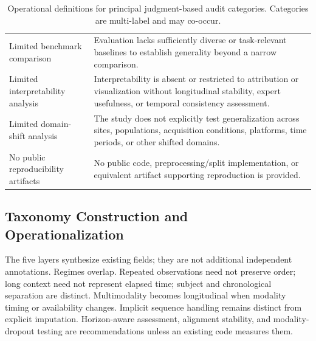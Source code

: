 \documentclass[11pt]{article}
\theoremstyle{plain}
\theoremstyle{definition}
\theoremstyle{remark}
\begin{document}
\begin{table}[!t]
\begin{tabularx}{\textwidth}{p{3.2cm}X}
Limited benchmark comparison & Evaluation lacks sufficiently diverse or task-relevant baselines to establish generality beyond a narrow comparison. \\
Limited interpretability analysis & Interpretability is absent or restricted to attribution or visualization without longitudinal stability, expert usefulness, or temporal consistency assessment. \\
Limited domain-shift analysis & The study does not explicitly test generalization across sites, populations, acquisition conditions, platforms, time periods, or other shifted domains. \\
No public reproducibility artifacts & No public code, preprocessing/split implementation, or equivalent artifact supporting reproduction is provided. \\
\bottomrule
\end{tabularx}
\caption{Operational definitions for principal judgment-based audit categories. Categories are multi-label and may co-occur.}
\label{tab:operational_definitions}
\end{table}

\subsection{Taxonomy Construction and Operationalization}
\label{sec:appendix_taxonomy}
The five layers synthesize existing fields; they are not additional independent annotations. Regimes overlap. Repeated observations need not preserve order; long context need not represent elapsed time; subject and chronological separation are distinct. Multimodality becomes longitudinal when modality timing or availability changes. Implicit sequence handling remains distinct from explicit imputation. Horizon-aware assessment, alignment stability, and modality-dropout testing are recommendations unless an existing code measures them.
\end{document}
